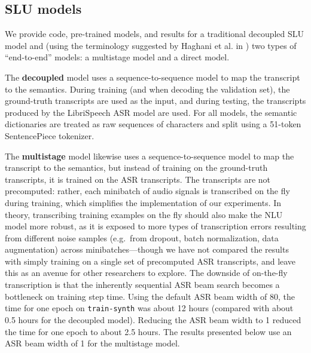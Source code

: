 \documentclass{article}
\begin{document}
\subsection{SLU models}\label{models}

We provide code, pre-trained models, and results for a traditional decoupled SLU model and (using the terminology suggested by Haghani et al. in \cite{Haghani2018}) two types of ``end-to-end'' models: a multistage model and a direct model.

The \textbf{decoupled} model uses a sequence-to-sequence model to map the transcript to the semantics. During training (and when decoding the validation set), the ground-truth transcripts are used as the input, and during testing, the transcripts produced by the LibriSpeech ASR model are used. For all models, the semantic dictionaries are treated as raw sequences of characters and split using a 51-token SentencePiece tokenizer.  

The \textbf{multistage} model likewise uses a sequence-to-sequence model to map the transcript to the semantics, but instead of training on the ground-truth transcripts, it is trained on the ASR transcripts. The transcripts are not precomputed: rather, each minibatch of audio signals is transcribed on the fly during training, which simplifies the implementation of our experiments.
In theory, transcribing training examples on the fly should also make the NLU model more robust, as it is exposed to more types of transcription errors resulting from different noise samples (e.g.~from dropout, batch normalization, data augmentation) across minibatches---though we have not compared the results with simply training on a single set of precomputed ASR transcripts, and leave this as an avenue for other researchers to explore. The downside of on-the-fly transcription is that the inherently sequential ASR beam search becomes a bottleneck on training step time. Using the default ASR beam width of 80, the time for one epoch on \texttt{train-synth} was about 12 hours (compared with about 0.5 hours for the decoupled model). Reducing the ASR beam width to 1 reduced the time for one epoch to about 2.5 hours. The results presented below use an ASR beam width of 1 for the multistage model.
\end{document}
